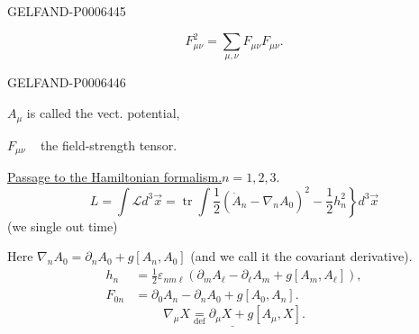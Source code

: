 \begin{GelfandAdjacentEvidence}{GELFAND-P000644}{5}

\[
F_{\mu\nu}^2=\sum_{\mu,\nu}F_{\mu\nu}F_{\mu\nu}.
\]
\end{GelfandAdjacentEvidence}
\begin{GelfandAdjacentEvidence}{GELFAND-P000644}{6}


\(A_\mu\) is called the vect. potential,

\(F_{\mu\nu}\) \textemdash\,\textquotedbl\,\textemdash\ the field-strength tensor.

\underline{Passage to the Hamiltonian formalism.}\quad \(n=1,2,3\).
\[
L=\int\mathcal Ld^3\vec x=\operatorname{tr}\int
\left.\frac12(\dot A_n-\nabla_n A_0)^2-\frac12h_n^2\right\}d^3\vec x
\]
(we single out time)
\end{GelfandAdjacentEvidence}


Here \(\nabla_n A_0=\partial_n A_0+g[A_n,A_0]\)
(and we call it the covariant derivative).
\[
\begin{aligned}
h_n&=\frac12\varepsilon_{nm\ell}(\partial_m A_\ell-\partial_\ell A_m+g[A_m,A_\ell]),\\
F_{0n}&=\partial_0 A_n-\partial_n A_0+g[A_0,A_n].
\end{aligned}
\]
\[
\underline{\nabla_\mu X\underset{\mathrm{def}}{=}\partial_\mu X+g[A_\mu,X]}.
\]


